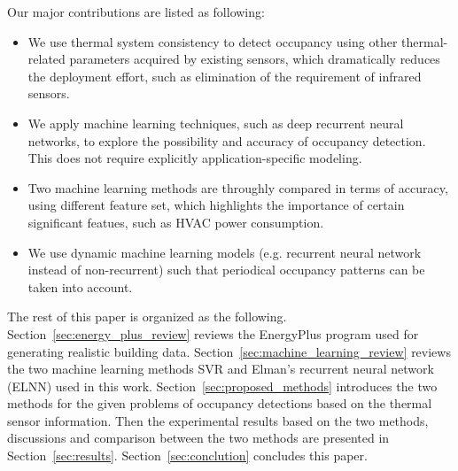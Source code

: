 Our major contributions are listed as following:
\begin{itemize}
\item We use thermal system consistency to detect occupancy using other
    thermal-related parameters acquired by existing sensors, which dramatically
    reduces the deployment effort, such as elimination of the requirement
    of infrared sensors.
\item We apply machine learning techniques, such as deep recurrent neural
    networks, to explore the possibility and accuracy of occupancy detection.
    This does not require explicitly application-specific modeling.
\item Two machine learning methods are throughly compared in terms of accuracy,
    using different feature set, which highlights the importance of certain
    significant featues, such as HVAC power consumption.
\item We use dynamic machine learning models (e.g. recurrent neural network
    instead of non-recurrent) such that periodical occupancy patterns can be taken
    into account.
\end{itemize}

The rest of this paper is organized as the following.
Section~\ref{sec:energy_plus_review} reviews the EnergyPlus program used for
generating realistic building data. Section~\ref{sec:machine_learning_review}
reviews the two machine learning methods SVR and Elman's recurrent neural
network (ELNN) used in this work. Section~\ref{sec:proposed_methods} introduces
the two methods for the given problems of occupancy detections based on the
thermal sensor information. Then the experimental results based on the two
methods, discussions and comparison between the two methods are presented in
Section~\ref{sec:results}. Section~\ref{sec:conclution} concludes this paper.
